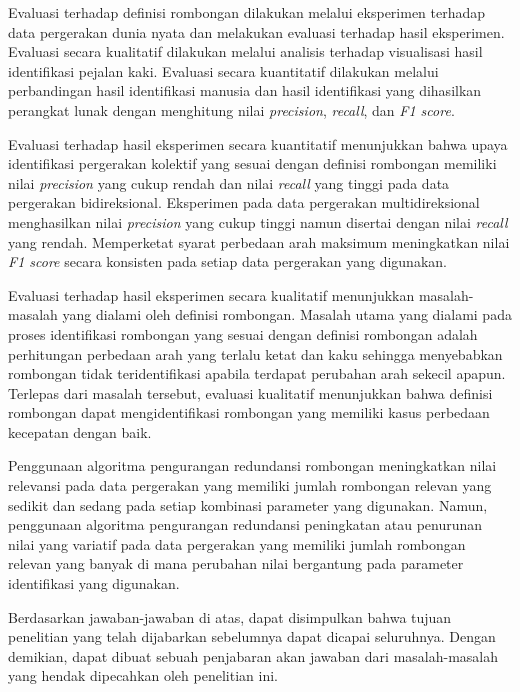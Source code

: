 \begin{enumerate}
    Evaluasi terhadap definisi rombongan dilakukan melalui eksperimen terhadap data pergerakan dunia nyata dan melakukan evaluasi terhadap hasil eksperimen. Evaluasi secara kualitatif dilakukan melalui analisis terhadap visualisasi hasil identifikasi pejalan kaki. Evaluasi secara kuantitatif dilakukan melalui perbandingan hasil identifikasi manusia dan hasil identifikasi yang dihasilkan perangkat lunak dengan menghitung nilai \textit{precision}, \textit{recall}, dan \textit{F1 score}.
    
    Evaluasi terhadap hasil eksperimen secara kuantitatif menunjukkan bahwa upaya identifikasi pergerakan kolektif yang sesuai dengan definisi rombongan memiliki nilai \textit{precision} yang cukup rendah dan nilai \textit{recall} yang tinggi pada data pergerakan bidireksional. Eksperimen pada data pergerakan multidireksional menghasilkan nilai \textit{precision} yang cukup tinggi namun disertai dengan nilai \textit{recall} yang rendah. Memperketat syarat perbedaan arah maksimum meningkatkan nilai \textit{F1 score} secara konsisten pada setiap data pergerakan yang digunakan.
    
    Evaluasi terhadap hasil eksperimen secara kualitatif menunjukkan masalah-masalah yang dialami oleh definisi rombongan. Masalah utama yang dialami pada proses identifikasi rombongan yang sesuai dengan definisi rombongan adalah perhitungan perbedaan arah yang terlalu ketat dan kaku sehingga menyebabkan rombongan tidak teridentifikasi apabila terdapat perubahan arah sekecil apapun. Terlepas dari masalah tersebut, evaluasi kualitatif menunjukkan bahwa definisi rombongan dapat mengidentifikasi rombongan yang memiliki kasus perbedaan kecepatan dengan baik.
    
    Penggunaan algoritma pengurangan redundansi rombongan meningkatkan nilai relevansi pada data pergerakan yang memiliki jumlah rombongan relevan yang sedikit dan sedang pada setiap kombinasi parameter yang digunakan. Namun, penggunaan algoritma pengurangan redundansi peningkatan atau penurunan nilai yang variatif pada data pergerakan yang memiliki jumlah rombongan relevan yang banyak di mana perubahan nilai bergantung pada parameter identifikasi yang digunakan.
\end{enumerate}

Berdasarkan jawaban-jawaban di atas, dapat disimpulkan bahwa tujuan penelitian yang telah dijabarkan sebelumnya dapat dicapai seluruhnya. Dengan demikian, dapat dibuat sebuah penjabaran akan jawaban dari masalah-masalah yang hendak dipecahkan oleh penelitian ini.

